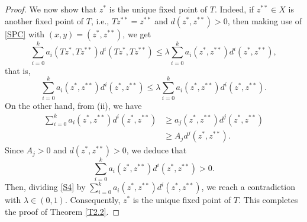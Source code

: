 \documentclass[10pt,a4paper]{amsart}
\begin{document}
\begin{proof}
We now show that $z^*$ is the unique fixed point of $T$. Indeed, if $z^{**}\in X$ is another fixed point of $T$, i.e., $Tz^{**}=z^{**}$ and $d(z^*,z^{**})>0$, then making use of \eqref{SPC} with $(x,y)=(z^*,z^{**})$, we get 
$$
\sum_{i=0}^ka_i(Tz^*,Tz^{**})d^i(Tz^*,Tz^{**})\leq \lambda \sum_{i=0}^k a_i(z^*,z^{**})d^i(z^*,z^{**}),	
$$ 
that is,
\begin{equation}\label{S4}
\sum_{i=0}^k a_i(z^*,z^{**})d^i(z^*,z^{**})\leq \lambda \sum_{i=0}^k a_i(z^*,z^{**})d^i(z^*,z^{**}).
\end{equation}
On the other hand, from	(ii), we have 
$$
\begin{aligned}
\sum_{i=0}^k a_i(z^*,z^{**})d^i(z^*,z^{**}) &\geq  a_j(z^*,z^{**})d^j(z^*,z^{**})\\
&\geq A_j d^j(z^*,z^{**}).
\end{aligned}
$$
Since $A_j>0$ and $d(z^*,z^{**})>0$, we deduce that 
$$
\sum_{i=0}^k a_i(z^*,z^{**})d^i(z^*,z^{**})>0. 
$$
Then, dividing  \eqref{S4} by $\sum_{i=0}^k a_i(z^*,z^{**})d^i(z^*,z^{**})$, we reach a contradiction with $\lambda\in (0,1)$. Consequently, $z^*$ is the unique fixed point of $T$. This completes the proof of Theorem \ref{T2.2}. 
\end{proof}
\end{document}
